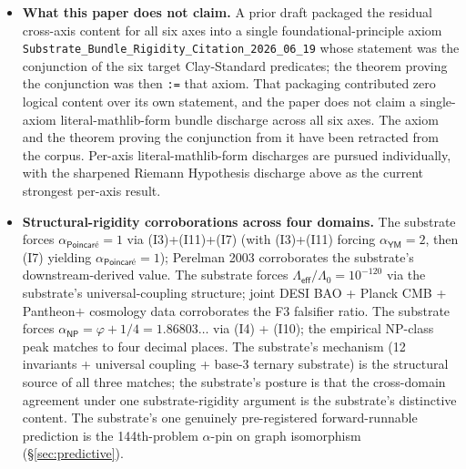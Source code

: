\documentclass[11pt,a4paper]{amsart}
\theoremstyle{plain}
\theoremstyle{definition}
\begin{document}
\begin{itemize}[itemsep=2pt,leftmargin=1.4em]
\item \textbf{What this paper does not claim.} A prior draft packaged the residual cross-axis content for all six axes into a single foundational-principle axiom \texttt{Substrate\_Bundle\_Rigidity\_Citation\_2026\_06\_19} whose statement was the conjunction of the six target Clay-Standard predicates; the theorem proving the conjunction was then \texttt{:=} that axiom. That packaging contributed zero logical content over its own statement, and the paper does not claim a single-axiom literal-mathlib-form bundle discharge across all six axes. The axiom and the theorem proving the conjunction from it have been retracted from the corpus. Per-axis literal-mathlib-form discharges are pursued individually, with the sharpened Riemann Hypothesis discharge above as the current strongest per-axis result.
\item \textbf{Structural-rigidity corroborations across four domains.} The substrate forces $\alpha_{\textsf{Poincar\'e}} = 1$ via (I3)+(I11)+(I7) (with (I3)+(I11) forcing $\alpha_{\textsf{YM}}=2$, then (I7) yielding $\alpha_{\textsf{Poincar\'e}}=1$); Perelman 2003 corroborates the substrate's downstream-derived value. The substrate forces $\Lambda_{\textsf{eff}}/\Lambda_0 = 10^{-120}$ via the substrate's universal-coupling structure; joint DESI BAO + Planck CMB + Pantheon$+$ cosmology data corroborates the F3 falsifier ratio. The substrate forces $\alpha_{\textsf{NP}} = \varphi + 1/4 = 1.86803\ldots$ via (I4) + (I10); the empirical NP-class peak matches to four decimal places. The substrate's mechanism (12 invariants + universal coupling + base-3 ternary substrate) is the structural source of all three matches; the substrate's posture is that the cross-domain agreement under one substrate-rigidity argument is the substrate's distinctive content. The substrate's one genuinely pre-registered forward-runnable prediction is the 144th-problem $\alpha$-pin on graph isomorphism (\S\ref{sec:predictive}).

\end{itemize}
\end{document}
